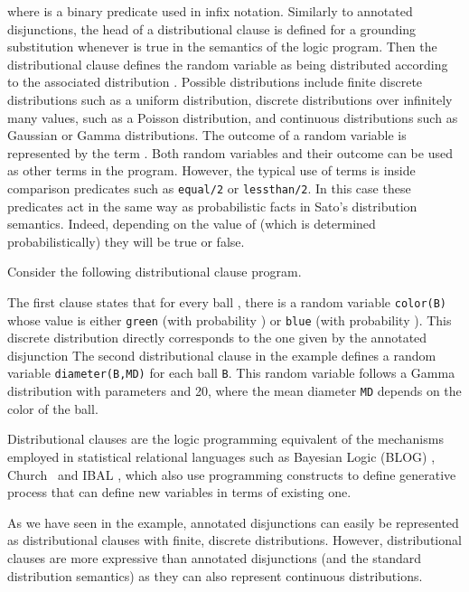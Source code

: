 \documentclass[a4paper]{article}
\begin{document}
where  is a binary predicate used in infix notation. 
Similarly to annotated disjunctions, the head   of a distributional clause
is defined for a grounding substitution  whenever  is true in the semantics of the logic program.  
Then the distributional clause defines the random variable 
 as being distributed according to the associated
distribution . Possible distributions include
finite discrete distributions such as a uniform distribution, discrete
distributions over infinitely many values, such as a Poisson
distribution,  and continuous distributions such as Gaussian or Gamma
distributions. The outcome of a random variable  is represented by
the term . 
Both random variables  and their outcome  can be used as other terms 
in the program. However, the typical use of  terms  is inside
comparison predicates such as \texttt{equal/2} or
\texttt{lessthan/2}. 
In this case these predicates act in the same way as probabilistic facts in Sato's distribution semantics. 
Indeed, depending on the value of  (which is determined
probabilistically) they will be true or false. 



Consider the following distributional clause program. 

The first clause states that for every ball , there is a random
variable \verb|color(B)| whose value is either \verb|green| (with
probability ) or \verb|blue| (with probability ). This
discrete distribution directly corresponds to the one given by the
annotated disjunction 
The second distributional clause in the example defines a random
variable \verb|diameter(B,MD)| for each ball \verb|B|. This random variable follows a Gamma distribution 
with parameters  and 20, where the mean diameter
\verb|MD| depends on the color of the ball. 


Distributional clauses are 
the logic programming equivalent of the mechanisms employed in
statistical relational languages such as Bayesian Logic (BLOG)
\citep{Milch05}, Church~\citep{Goodman08} and IBAL \citep{Pfeffer01}, which also use programming
constructs to define generative process that can define 
new variables in terms of existing one.

As we have seen in the example, annotated disjunctions can easily be
represented as distributional clauses with finite, discrete
distributions.  
However, distributional clauses are more expressive than annotated
disjunctions (and the standard distribution semantics) as they can also represent continuous distributions. 
\end{document}
